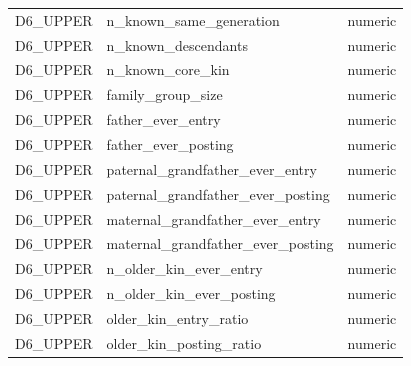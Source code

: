 \begin{longtable}{lll}
D6\_UPPER & n\_known\_same\_generation & numeric \\
D6\_UPPER & n\_known\_descendants & numeric \\
D6\_UPPER & n\_known\_core\_kin & numeric \\
D6\_UPPER & family\_group\_size & numeric \\
D6\_UPPER & father\_ever\_entry & numeric \\
D6\_UPPER & father\_ever\_posting & numeric \\
D6\_UPPER & paternal\_grandfather\_ever\_entry & numeric \\
D6\_UPPER & paternal\_grandfather\_ever\_posting & numeric \\
D6\_UPPER & maternal\_grandfather\_ever\_entry & numeric \\
D6\_UPPER & maternal\_grandfather\_ever\_posting & numeric \\
D6\_UPPER & n\_older\_kin\_ever\_entry & numeric \\
D6\_UPPER & n\_older\_kin\_ever\_posting & numeric \\
D6\_UPPER & older\_kin\_entry\_ratio & numeric \\
D6\_UPPER & older\_kin\_posting\_ratio & numeric \\
\bottomrule
\end{longtable}

